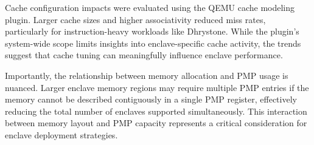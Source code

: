 Cache configuration impacts were evaluated using the QEMU cache modeling plugin. Larger cache sizes and higher associativity reduced miss rates, particularly for instruction-heavy workloads like Dhrystone. While the plugin’s system-wide scope limits insights into enclave-specific cache activity, the trends suggest that cache tuning can meaningfully influence enclave performance.

Importantly, the relationship between memory allocation and PMP usage is nuanced. Larger enclave memory regions may require multiple PMP entries if the memory cannot be described contiguously in a single PMP register, effectively reducing the total number of enclaves supported simultaneously. This interaction between memory layout and PMP capacity represents a critical consideration for enclave deployment strategies.
